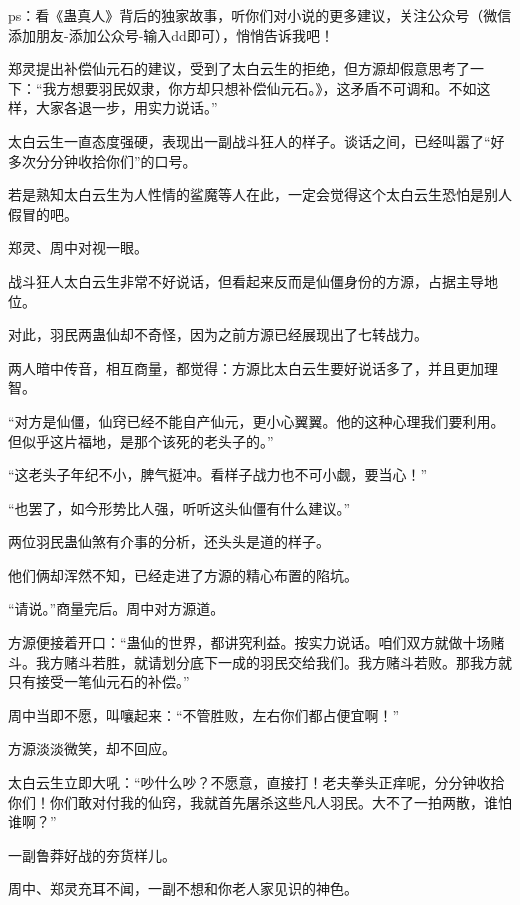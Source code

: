 
\begin{this_body}



ps：看《蛊真人》背后的独家故事，听你们对小说的更多建议，关注公众号（微信添加朋友-添加公众号-输入dd即可），悄悄告诉我吧！

郑灵提出补偿仙元石的建议，受到了太白云生的拒绝，但方源却假意思考了一下：“我方想要羽民奴隶，你方却只想补偿仙元石。》，这矛盾不可调和。不如这样，大家各退一步，用实力说话。”

太白云生一直态度强硬，表现出一副战斗狂人的样子。谈话之间，已经叫嚣了“好多次分分钟收拾你们”的口号。

若是熟知太白云生为人性情的鲨魔等人在此，一定会觉得这个太白云生恐怕是别人假冒的吧。

郑灵、周中对视一眼。

战斗狂人太白云生非常不好说话，但看起来反而是仙僵身份的方源，占据主导地位。

对此，羽民两蛊仙却不奇怪，因为之前方源已经展现出了七转战力。

两人暗中传音，相互商量，都觉得：方源比太白云生要好说话多了，并且更加理智。

“对方是仙僵，仙窍已经不能自产仙元，更小心翼翼。他的这种心理我们要利用。但似乎这片福地，是那个该死的老头子的。”

“这老头子年纪不小，脾气挺冲。看样子战力也不可小觑，要当心！”

“也罢了，如今形势比人强，听听这头仙僵有什么建议。”

两位羽民蛊仙煞有介事的分析，还头头是道的样子。

他们俩却浑然不知，已经走进了方源的精心布置的陷坑。

“请说。”商量完后。周中对方源道。

方源便接着开口：“蛊仙的世界，都讲究利益。按实力说话。咱们双方就做十场赌斗。我方赌斗若胜，就请划分底下一成的羽民交给我们。我方赌斗若败。那我方就只有接受一笔仙元石的补偿。”

周中当即不愿，叫嚷起来：“不管胜败，左右你们都占便宜啊！”

方源淡淡微笑，却不回应。

太白云生立即大吼：“吵什么吵？不愿意，直接打！老夫拳头正痒呢，分分钟收拾你们！你们敢对付我的仙窍，我就首先屠杀这些凡人羽民。大不了一拍两散，谁怕谁啊？”

一副鲁莽好战的夯货样儿。

周中、郑灵充耳不闻，一副不想和你老人家见识的神色。


\end{this_body}
